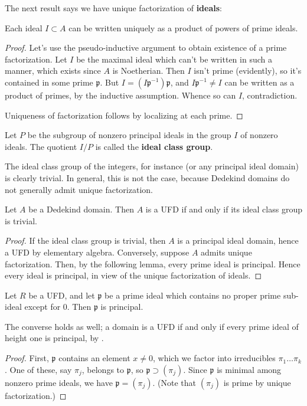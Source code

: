 The next result says we have unique factorization of \textbf{ideals}:
\begin{theorem}[Factorization] Each ideal $I \subset A$ can be written uniquely as a product of powers of prime ideals.
\end{theorem}
\begin{proof}
Let's use the pseudo-inductive argument to obtain existence of a prime factorization.  Let $I$ be the maximal ideal which can't be written in such a manner, which exists since $A$ is Noetherian.  Then $I$ isn't prime (evidently), so it's contained in some prime $\mathfrak{p}$.  But $I = (I\mathfrak{p}^{-1})\mathfrak{p}$, and $I\mathfrak{p}^{-1} \neq I$ can be written as a product of primes, by the inductive assumption. Whence so can $I$, contradiction.

Uniqueness of factorization follows by localizing at each prime.
\end{proof}

\begin{definition} Let $P$ be the subgroup of nonzero principal ideals in the group $I$ of nonzero ideals.  The quotient $I/P$ is called the \textbf{ideal class group}.
\end{definition}

The ideal class group of the integers, for instance (or any principal ideal domain) is clearly trivial.  In general, this is not the case, because Dedekind domains do not generally admit unique factorization.
\begin{proposition} Let $A$ be a Dedekind domain. Then $A$ is a UFD if and only if its ideal class group is trivial.
\end{proposition}
\begin{proof} If the ideal class group is trivial, then $A$ is a principal ideal domain, hence a UFD by elementary algebra.  Conversely, suppose $A$ admits unique factorization.  
Then, by the following lemma, every prime ideal is principal.  Hence every ideal is principal, in view of the unique factorization of ideals.
\end{proof}
\begin{lemma} Let $R$ be a UFD, and let $\mathfrak{p}$ be a prime ideal which contains no proper prime sub-ideal except for $0$.  Then $\mathfrak{p}$ is principal.
\end{lemma}
The converse holds as well; a domain is a UFD if and only if every prime ideal
of height one is principal, by .
\begin{proof}
First, $\mathfrak{p}$ contains an element $x \neq 0$, which we factor into irreducibles $\pi_1 \dots \pi_k$.  One of these, say $\pi_j$, belongs to $\mathfrak{p}$, so $\mathfrak{p} \supset (\pi_j)$. Since $\mathfrak{p}$ is minimal among nonzero prime ideals, we have $\mathfrak{p} = (\pi_j)$.  (Note that $(\pi_j)$ is prime by unique factorization.)
\end{proof}

